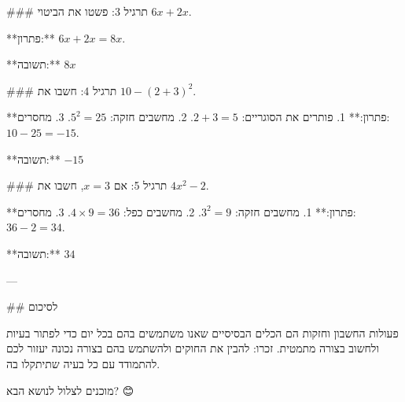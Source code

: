 ### תרגיל 3:
פשטו את הביטוי $6x + 2x$.

**פתרון:**
$6x + 2x = 8x$.

**תשובה:** $8x$

### תרגיל 4:
חשבו את $10 - (2 + 3)^2$.

**פתרון:**
1. פותרים את הסוגריים: $2 + 3 = 5$.
2. מחשבים חזקה: $5^2 = 25$.
3. מחסרים: $10 - 25 = -15$.

**תשובה:** $-15$

### תרגיל 5:
אם $x = 3$, חשבו את $4x^2 - 2$.

**פתרון:**
1. מחשבים חזקה: $3^2 = 9$.
2. מחשבים כפל: $4 \times 9 = 36$.
3. מחסרים: $36 - 2 = 34$.

**תשובה:** $34$

---

## לסיכום

פעולות החשבון וחזקות הם הכלים הבסיסיים שאנו משתמשים בהם בכל יום כדי לפתור בעיות ולחשוב בצורה מתמטית. זכרו: להבין את החוקים ולהשתמש בהם בצורה נכונה יעזור לכם להתמודד עם כל בעיה שתיתקלו בה. 

מוכנים לצלול לנושא הבא? 😊

